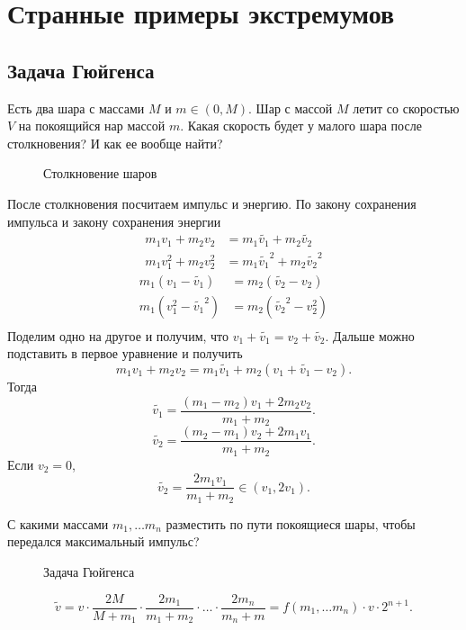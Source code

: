 % 
% 

\section{Странные примеры экстремумов}
\subsection{Задача Гюйгенса}
\begin{desc}
    Есть два шара с массами $ M$ и $ m \in (0, M)$. Шар с массой $ M$ летит со скоростью  $ V$ на покоящийся нар массой  $ m$. Какая скорость будет у малого шара после столкновения? И как ее вообще найти?
\end{desc}
\begin{center}
\begin{figure}[ht]
    \centering
    \caption{Столкновение шаров}
    \label{fig:balls}
\end{figure}
\end{center}
После столкновения посчитаем импульс и энергию.
По закону сохранения импульса и закону сохранения энергии
\begin{align*}
    m_1v_1 + m_2v_2 &= m_1 \widetilde{ v_1} + m_2 \widetilde{ v_2} \\
m_1v_1^2 + m_2v_2^2 &= m_1 \widetilde{ v_1}^2 + m_2 \widetilde{ v_2}^2 
\end{align*}
\begin{align*}
    m_1(v_1-\widetilde{ v_1} ) &= m_2(\widetilde{ v_2} -v_2)\\
    m_1(v_1^2-\widetilde{ v_1}^2 ) &= m_2(\widetilde{ v_2}^2 -v_2^2)\\
\end{align*}
Поделим одно на другое и получим, что $ v_1+\widetilde{ v_1} = v_2+\widetilde{ v_2}  $.
Дальше можно подставить в первое уравнение и получить
\[
    m_1v_1+ m_2v_2 =m_1 \widetilde{ v_1} +m_2(v_1+ \widetilde{ v_1} -v_2)
.\] 
Тогда
\[
    \widetilde{ v_1}= \frac{(m_1-m_2)v_1 +2m_2v_2}{m_1+m_2}
.\] 
\[
    \widetilde{ v_2}= \frac{(m_2-m_1)v_2 +2m_1v_1}{m_1+m_2}
.\] 
Если $ v_2=0$, 
\[
	\widetilde{ v_2} = \frac{2m_1v_1}{m_1+m_2}  \in (v_1, 2v_1)
.\] 
\begin{defn}
    С какими массами $ m_1, \ldots m_n$ разместить по пути покоящиеся шары, чтобы передался максимальный импульс?
\end{defn}
\begin{figure}[ht]
    \centering
    \caption{Задача Гюйгенса}
    \label{fig:huygens-task}
\end{figure}
\[
	\widetilde{v} = v \cdot  \frac{2M}{M+m_1} \cdot  \frac{2m_1}{m_1+m_2} \cdot \ldots \cdot \frac{2m_n}{m_n +m} = f(m_1, \ldots m_n) \cdot v \cdot 2^{n+1}
.\] 

